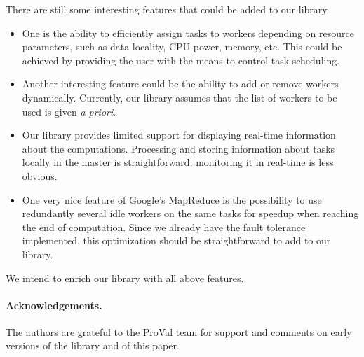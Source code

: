\documentclass[a4paper,12pt]{article}
\begin{document}
There are still some interesting features that could be added to our
library. 
\begin{itemize}
\item 
  One is the ability to efficiently assign tasks to workers depending
  on resource parameters, such as data locality, CPU power, memory,
  etc. This could be achieved by providing the user with the means to control
  task scheduling.  
\item 
  Another interesting feature could be the ability
  to add or remove workers dynamically. Currently, our library assumes
  that the list of workers to be used is given \emph{a priori}.
\item
  Our library provides limited support for displaying real-time
  information about the computations. Processing and storing
  information about tasks locally in the master is straightforward; 
  monitoring it in real-time is less obvious.
\item 
  One very nice feature of Google's MapReduce is the possibility to
  use redundantly several idle workers on the same tasks
  for speedup when reaching the end of computation.
  Since we already have the fault tolerance implemented, this
  optimization should be straightforward to add to our library.
\end{itemize}
We intend to enrich our library with all above features.



\paragraph{Acknowledgements.}
The authors are grateful to the ProVal team for support and comments
on early versions of the library and of this paper.



\end{document}
